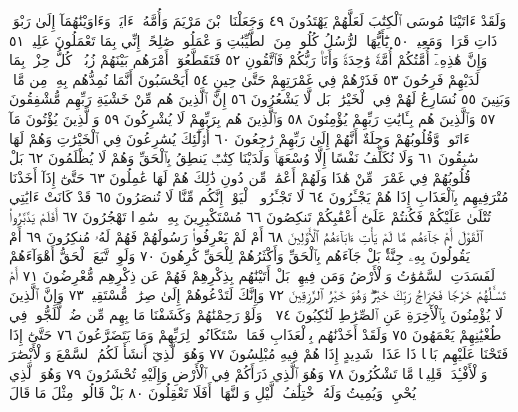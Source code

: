 وَلَقَدْ ءَاتَيْنَا مُوسَى ٱلْكِتَٰبَ لَعَلَّهُمْ يَهْتَدُونَ ٤٩ وَجَعَلْنَا ٱبْنَ
مَرْيَمَ وَأُمَّهُۥٓ ءَايَةࣰ وَءَاوَيْنَٰهُمَآ إِلَىٰ رَبْوَةࣲ ذَاتِ قَرَارࣲ وَمَعِينࣲ ٥٠
يَٰٓأَيُّهَا ٱلرُّسُلُ كُلُوا۟ مِنَ ٱلطَّيِّبَٰتِ وَٱعْمَلُوا۟ صَٰلِحًاۖ إِنِّي بِمَا
تَعْمَلُونَ عَلِيمࣱ ٥١ وَإِنَّ هَٰذِهِۦٓ أُمَّتُكُمْ أُمَّةࣰ وَٰحِدَةࣰ وَأَنَا۠ رَبُّكُمْ
فَٱتَّقُونِ ٥٢ فَتَقَطَّعُوٓا۟ أَمْرَهُم بَيْنَهُمْ زُبُرࣰاۖ كُلُّ حِزْبِۭ بِمَا لَدَيْهِمْ
فَرِحُونَ ٥٣ فَذَرْهُمْ فِي غَمْرَتِهِمْ حَتَّىٰ حِينٍ ٥٤ أَيَحْسَبُونَ أَنَّمَا نُمِدُّهُم
بِهِۦ مِن مَّالࣲ وَبَنِينَ ٥٥ نُسَارِعُ لَهُمْ فِي ٱلْخَيْرَٰتِۚ بَل لَّا يَشْعُرُونَ ٥٦
إِنَّ ٱلَّذِينَ هُم مِّنْ خَشْيَةِ رَبِّهِم مُّشْفِقُونَ ٥٧ وَٱلَّذِينَ هُم
بِـَٔايَٰتِ رَبِّهِمْ يُؤْمِنُونَ ٥٨ وَٱلَّذِينَ هُم بِرَبِّهِمْ لَا يُشْرِكُونَ ٥٩
وَٱلَّذِينَ يُؤْتُونَ مَآ ءَاتَوا۟ وَّقُلُوبُهُمْ وَجِلَةٌ أَنَّهُمْ إِلَىٰ رَبِّهِمْ رَٰجِعُونَ ٦٠
أُو۟لَٰٓئِكَ يُسَٰرِعُونَ فِي ٱلْخَيْرَٰتِ وَهُمْ لَهَا سَٰبِقُونَ ٦١ وَلَا نُكَلِّفُ
نَفْسًا إِلَّا وُسْعَهَاۚ وَلَدَيْنَا كِتَٰبࣱ يَنطِقُ بِٱلْحَقِّ وَهُمْ لَا يُظْلَمُونَ ٦٢
بَلْ قُلُوبُهُمْ فِي غَمْرَةࣲ مِّنْ هَٰذَا وَلَهُمْ أَعْمَٰلࣱ مِّن دُونِ ذَٰلِكَ
هُمْ لَهَا عَٰمِلُونَ ٦٣ حَتَّىٰٓ إِذَآ أَخَذْنَا مُتْرَفِيهِم بِٱلْعَذَابِ إِذَا هُمْ
يَجْـَٔرُونَ ٦٤ لَا تَجْـَٔرُوا۟ ٱلْيَوْمَۖ إِنَّكُم مِّنَّا لَا تُنصَرُونَ ٦٥ قَدْ كَانَتْ
ءَايَٰتِي تُتْلَىٰ عَلَيْكُمْ فَكُنتُمْ عَلَىٰٓ أَعْقَٰبِكُمْ تَنكِصُونَ ٦٦
مُسْتَكْبِرِينَ بِهِۦ سَٰمِرࣰا تَهْجُرُونَ ٦٧ أَفَلَمْ يَدَّبَّرُوا۟ ٱلْقَوْلَ أَمْ
جَآءَهُم مَّا لَمْ يَأْتِ ءَابَآءَهُمُ ٱلْأَوَّلِينَ ٦٨ أَمْ لَمْ يَعْرِفُوا۟ رَسُولَهُمْ
فَهُمْ لَهُۥ مُنكِرُونَ ٦٩ أَمْ يَقُولُونَ بِهِۦ جِنَّةُۢۚ بَلْ جَآءَهُم بِٱلْحَقِّ
وَأَكْثَرُهُمْ لِلْحَقِّ كَٰرِهُونَ ٧٠ وَلَوِ ٱتَّبَعَ ٱلْحَقُّ أَهْوَآءَهُمْ لَفَسَدَتِ
ٱلسَّمَٰوَٰتُ وَٱلْأَرْضُ وَمَن فِيهِنَّۚ بَلْ أَتَيْنَٰهُم بِذِكْرِهِمْ فَهُمْ
عَن ذِكْرِهِم مُّعْرِضُونَ ٧١ أَمْ تَسْـَٔلُهُمْ خَرْجࣰا فَخَرَاجُ رَبِّكَ خَيْرࣱۖ
وَهُوَ خَيْرُ ٱلرَّٰزِقِينَ ٧٢ وَإِنَّكَ لَتَدْعُوهُمْ إِلَىٰ صِرَٰطࣲ مُّسْتَقِيمࣲ ٧٣
وَإِنَّ ٱلَّذِينَ لَا يُؤْمِنُونَ بِٱلْأٓخِرَةِ عَنِ ٱلصِّرَٰطِ لَنَٰكِبُونَ ٧٤
۞ وَلَوْ رَحِمْنَٰهُمْ وَكَشَفْنَا مَا بِهِم مِّن ضُرࣲّ لَّلَجُّوا۟ فِي طُغْيَٰنِهِمْ
يَعْمَهُونَ ٧٥ وَلَقَدْ أَخَذْنَٰهُم بِٱلْعَذَابِ فَمَا ٱسْتَكَانُوا۟ لِرَبِّهِمْ
وَمَا يَتَضَرَّعُونَ ٧٦ حَتَّىٰٓ إِذَا فَتَحْنَا عَلَيْهِم بَابࣰا ذَا عَذَابࣲ شَدِيدٍ
إِذَا هُمْ فِيهِ مُبْلِسُونَ ٧٧ وَهُوَ ٱلَّذِيٓ أَنشَأَ لَكُمُ ٱلسَّمْعَ وَٱلْأَبْصَٰرَ
وَٱلْأَفْـِٔدَةَۚ قَلِيلࣰا مَّا تَشْكُرُونَ ٧٨ وَهُوَ ٱلَّذِي ذَرَأَكُمْ فِي ٱلْأَرْضِ
وَإِلَيْهِ تُحْشَرُونَ ٧٩ وَهُوَ ٱلَّذِي يُحْيِۦ وَيُمِيتُ وَلَهُ ٱخْتِلَٰفُ
ٱلَّيْلِ وَٱلنَّهَارِۚ أَفَلَا تَعْقِلُونَ ٨٠ بَلْ قَالُوا۟ مِثْلَ مَا قَالَ
